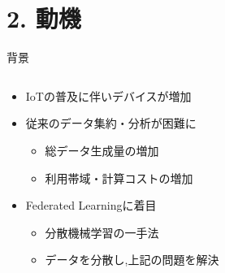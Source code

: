 \documentclass[unicode,12pt,aspectratio=169, dvipdfmx]{beamer}
\begin{document}
    \section{2. 動機}
    \begin{frame}{背景}
        \begin{columns}
            \begin{column}[T]{.6\linewidth}
                \begin{itemize}
                    \item IoTの普及に伴いデバイスが増加
                    \item 従来のデータ集約・分析が困難に
                    \begin{itemize}
                        \item 総データ生成量の増加
                        \item 利用帯域・計算コストの増加
                    \end{itemize}
                    \item Federated Learningに着目
                    \begin{itemize}
                        \item 分散機械学習の一手法
                        \item データを分散し,上記の問題を解決
                    \end{itemize}
                \end{itemize}
            \end{column}
        \end{columns}
    \end{frame}
\end{document}
